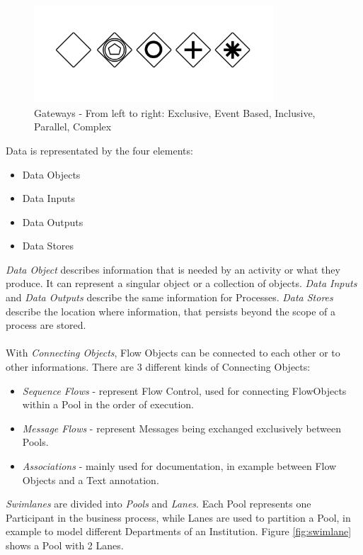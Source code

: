 \begin{figure}[htbp]
	\centering
		\includegraphics[width=0.8\textwidth]{images/gateways.png}
	\caption{Gateways - From left to right: Exclusive, Event Based, Inclusive, Parallel, Complex}
	\label{fig:gateways}
\end{figure}



Data is representated by the four elements:
\begin{itemize}
	\item Data Objects
	\item Data Inputs
	\item Data Outputs
	\item Data Stores
\end{itemize}
\textit{Data Object} describes information that is needed by an activity or what they produce. It can represent a singular object or a collection of objects. \textit{Data Inputs} and \textit{Data Outputs} describe the same information for Processes. \textit{Data Stores} describe the location where information, that persists beyond the scope of a process are stored.\\\\
With \textit{Connecting Objects}, Flow Objects can be connected to each other or to other informations. There are 3 different kinds of Connecting Objects:
\begin{itemize}
	\item \textit{Sequence Flows} - represent Flow Control, used for connecting FlowObjects within a Pool in the order of execution.
	\item \textit{Message Flows} - represent Messages being exchanged exclusively between Pools.
	\item \textit{Associations} -  mainly used for documentation, in example between Flow Objects and a Text annotation.
\end{itemize}
\textit{Swimlanes} are divided into \textit{Pools} and \textit{Lanes}. Each Pool represents one Participant in the business process, while Lanes are used to partition a Pool, in example to model different Departments of an Institution. Figure \ref{fig:swimlane} shows a Pool with 2 Lanes.\\\\
